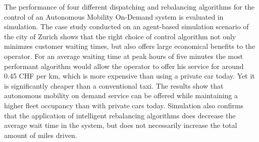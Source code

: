 The performance of four different dispatching and rebalancing algorithms for the
control of an Autonomous Mobility On-Demand system is evaluated in simulation.
The case study conducted on an agent-based simulation scenario of the city of Zurich
shows that the right choice of control algorithm not only minimzes customer waiting
times, but also offers large economical benefits to the operator. For an average
waiting time at peak hours of five minutes the most performant algorithm would allow
the operator to offer his service for around 0.45 CHF per km, which is more expensive
than using a private car today. Yet it is significantly cheaper than a conventional
taxi. The results show that autonomous mobility on demand service can be offered
while maintaining a higher fleet occupancy than with private cars today. Simulation
also confirms that the application of intelligent rebalancing algorithms does decrease
the average wait time in the system, but does not necessarily increase the total
amount of miles driven.
